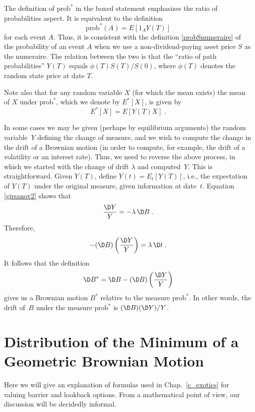 The definition of $\text{prob}^*$ in the boxed statement emphasizes the ratio of probabilities aspect.  It is equivalent to the definition
\begin{equation}\label{girsanov104}
\text{prob}^*(A) =  E\left[1_AY(T)\right]
\end{equation}
for each event $A$.  Thus, it is consistent with the definition \eqref{probSnumeraire} of the probability of an event $A$ when we use a non-dividend-paying asset price $S$ as the numeraire.  The relation between the two is that the ``ratio of path probabilities'' $Y(T)$ equals $\phi(T)S(T)/S(0)$, where $\phi(T)$ denotes the random state price at date $T$.

Note also that for any random variable $X$ (for which the mean exists) the mean of $X$ under $\text{prob}^*$, which we denote by $E^*[X]$, is given by
\begin{equation}\label{girsanov105}
E^*[X] = E[Y(T)X]\;.
\end{equation}

In some cases we may be given (perhaps by equilibrium arguments) the random variable~$Y$ defining the change of measure, and we wish to compute the change in the drift of a Brownian motion (in order to compute, for example, the drift of a volatility or an interest rate).  Thus, we need to reverse the above process, in which we started with the change of drift $\lambda$ and computed~$Y$.  This is straightforward.  Given $Y(T)$, define $Y(t) = E_t[Y(T)]$, i.e., the expectation of $Y(T)$ under the original measure, given information at date~$t$.  Equation \eqref{girsanov2} shows that
$$\frac{\D Y}{Y} = -\lambda\,\D B\; .$$
Therefore, 
$$-(\D B)\left(\frac{\D Y}{Y}\right) = \lambda\,\D t\; .$$
It follows that the definition
$$\D B^* = \D B - (\D B)\left(\frac{\D Y}{Y}\right)$$
gives us a Brownian motion $B^*$ relative to the measure $\text{prob}^*$.  In other words, the drift of~$B$ under the measure $\text{prob}^*$ is $(\D B)(\D Y)/Y$.

\section[The Minimum of a Geometric Brownian Motion]{Distribution of the Minimum of a Geometric Brownian Motion}\label{a_minimum}

Here we will give an explanation of formulas used in Chap.~\ref{c_exotics}  for valuing barrier and lookback options.  From a mathematical point of view, our discussion will be decidedly informal.

